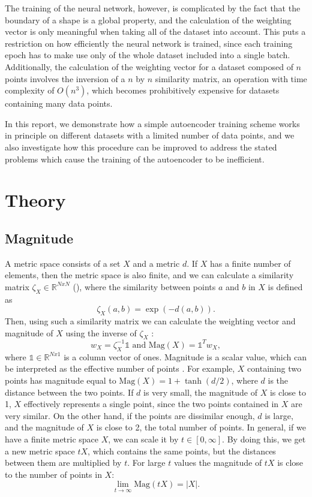 \documentclass{article}
\begin{document}
The training of the neural network, however, is complicated by the fact that the boundary of a shape is a global property, and the calculation of the weighting vector is only meaningful when taking all of the dataset into account. This puts a restriction on how efficiently the neural network is trained, since each training epoch has to make use only of the whole dataset included into a single batch. Additionally, the calculation of the weighting vector for a dataset composed of $n$ points involves the inversion of a $n$ by $n$ similarity matrix, an operation with time complexity of $O(n^3)$, which becomes prohibitively expensive  for datasets containing many data points.

In this report, we demonstrate how a simple autoencoder training scheme works in principle on different datasets with a limited number of data points, and we also investigate how this procedure can be improved to address the stated problems which cause the training of the autoencoder to be inefficient.

\section{Theory}

\subsection{Magnitude}

A metric space consists of a set $X$ and a metric $d$. If $X$ has a finite number of elements, then the metric space is also finite, and we can calculate a similarity matrix $\zeta_{X} \in \mathbb{R}^{NxN}$ (\cite{Bunch2021}), where the similarity between points $a$ and $b$ in $X$ is defined as $$\zeta_{X}(a, b) = \exp{(-d(a, b))}.$$ Then, using such a similarity matrix we can calculate the weighting vector and magnitude of $X$ using the inverse of $\zeta_{X}$ : $$w_{X} = \zeta_{X}^{-1} \mathds{1} \text{ and } \text{Mag}(X) = \mathds{1}^{T} w_{X} ,$$ where $\mathds{1} \in \mathbb{R}^{Nx1}$ is a column vector of ones. Magnitude is a scalar value, which can be interpreted as the effective number of points \cite{Leinster2010}. For example, $X$ containing two points has magnitude equal to $\text{Mag}(X) = 1 + \tanh(d/2)$, where $d$ is the distance between the two points. If $d$ is very small, the magnitude of $X$ is close to 1, $X$ effectively represents a single point, since the two points contained in $X$ are very similar. On the other hand, if the points are dissimilar enough, $d$ is large, and the magnitude of $X$ is close to 2, the total number of points. In general, if we have a finite metric space $X$, we can scale it by $t \in [0, \infty]$. By doing this, we get a new metric space $tX$, which contains the same points, but the distances between them are multiplied by $t$. For large $t$ values the magnitude of $tX$ is close to  the number of points in $X$: $$\lim_{t \rightarrow \infty} \text{Mag}(tX) = |X|.$$
\end{document}
